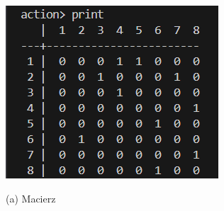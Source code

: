 \documentclass{article}
\begin{document}
	\begin{figure}[htbp]
		\centering
		\begin{minipage}[b]{0.3\textwidth}
			\centering
			\includegraphics[width=\textwidth]{reprezentacja_matrix_k.png}
			\par\small (a) Macierz
			

\end{minipage}
\end{figure}
\end{document}
